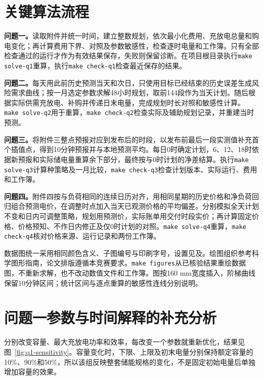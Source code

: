 \clearpage
\section{关键算法流程}

\textbf{问题一。}读取附件并统一时间，建立整数规划，依次最小化费用、充放电总量和购电变化；再计算费用下界、对照及参数敏感性，检查逐时电量和工作簿。只有全部检查通过的运行才作为有效结果保存，失败则保留诊断。在项目根目录执行\texttt{make solve-q1}重算，执行\texttt{make check-q1}检查最近保存的结果。

\textbf{问题二。}每天用此前历史预测当天和次日，只使用目标已经结束的历史误差生成风险需求曲线；按一月选定参数求解48小时规划，取前144段作为当天计划。随后根据实际供需充放电、补购并传递日末电量，完成规划时长对照和敏感性计算。\texttt{make solve-q2}用于重算，\texttt{make check-q2}检查实际及辅助规划记录，并重建当时预测。

\textbf{问题三。}将附件三整点预报对应到发布后的时段，以发布前最后一段实测值补充首个插值点，得到10分钟预报并与本地预测平均。每日0时确定计划，6、12、18时依据新预报和实际储电量重算余下部分，最终按与0时计划的净差结算。执行\texttt{make solve-q3}计算\QThreeStrategyCount 种策略及一月比较，\texttt{make check-q3}检查计划版本、实际运行、费用和工作簿。

\textbf{问题四。}附件四按与负荷相同的连续日历对齐，用相同星期的历史价格和净负荷回归组合预测电价，在调整时点加入当天已观测价格的平均偏差。分别模拟全天计划不变和日内可调整策略，规划用预测价，实际账单用交付时段实价；再计算固定价格、价格预知、不作日内修正及仅0时计划的对照。\texttt{make solve-q4}重算，\texttt{make check-q4}核对价格来源、运行记录和两份工作簿。

数据图统一采用相同颜色含义、子图编号与印刷字号，设置见及。绘图组织参考科学图形指南\cite{nature-figure-guide,neurips-figure-style}，论文排版遵循本竞赛要求。\texttt{make figures}从已核验结果重绘数据图，不重新求解，也不改动数值文件和工作簿。图按160 mm宽度插入，阶梯曲线保留10分钟区间；统计区间与逐点重算的敏感性连线分别说明。

\clearpage
\section{问题一参数与时间解释的补充分析}
\label{app:q1-sensitivity}

分别改变容量、最大充放电功率和效率，每改变一个参数就重新优化，结果见图~\ref{fig:q1-sensitivity}。容量变化时，下限、上限及初末电量分别保持额定容量的10\%、90\%和50\%，所以该组反映整套储能规格的变化，不是固定初始电量后单独增加容量的效果。

